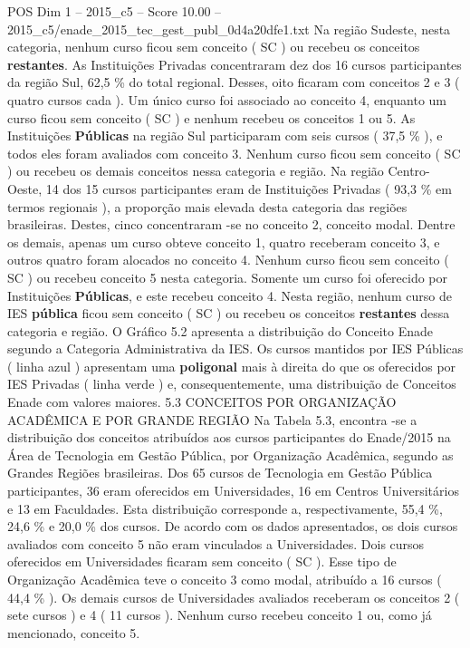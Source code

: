 \begin{textsample}{POS Dim 1 – 2015\_c5 – Score 10.00 – 2015\_c5/enade\_2015\_tec\_gest\_publ\_0d4a20dfe1.txt}
Na região Sudeste, nesta categoria, nenhum curso ficou sem conceito ( SC ) ou recebeu os conceitos \textbf{restantes}.
As Instituições Privadas concentraram dez dos 16 cursos participantes da região Sul, 62,5 \% do total regional.
Desses, oito ficaram com conceitos 2 e 3 ( quatro cursos cada ).
Um único curso foi associado ao conceito 4, enquanto um curso ficou sem conceito ( SC ) e nenhum recebeu os conceitos 1 ou 5.
As Instituições \textbf{Públicas} na região Sul participaram com seis cursos ( 37,5 \% ), e todos eles foram avaliados com conceito 3.
Nenhum curso ficou sem conceito ( SC ) ou recebeu os demais conceitos nessa categoria e região.
Na região Centro-Oeste, 14 dos 15 cursos participantes eram de Instituições Privadas ( 93,3 \% em termos regionais ), a proporção mais elevada desta categoria das regiões brasileiras.
Destes, cinco concentraram -se no conceito 2, conceito modal.
Dentre os demais, apenas um curso obteve conceito 1, quatro receberam conceito 3, e outros quatro foram alocados no conceito 4.
Nenhum curso ficou sem conceito ( SC ) ou recebeu conceito 5 nesta categoria.
Somente um curso foi oferecido por Instituições \textbf{Públicas}, e este recebeu conceito 4.
Nesta região, nenhum curso de IES \textbf{pública} ficou sem conceito ( SC ) ou recebeu os conceitos \textbf{restantes} dessa categoria e região.
O Gráfico 5.2 apresenta a distribuição do Conceito Enade segundo a Categoria Administrativa da IES.
Os cursos mantidos por IES Públicas ( linha azul ) apresentam uma \textbf{poligonal} mais à direita do que os oferecidos por IES Privadas ( linha verde ) e, consequentemente, uma distribuição de Conceitos Enade com valores maiores. 5.3 CONCEITOS POR ORGANIZAÇÃO ACADÊMICA E POR GRANDE REGIÃO Na Tabela 5.3, encontra -se a distribuição dos conceitos atribuídos aos cursos participantes do Enade/2015 na Área de Tecnologia em Gestão Pública, por Organização Acadêmica, segundo as Grandes Regiões brasileiras.
Dos 65 cursos de Tecnologia em Gestão Pública participantes, 36 eram oferecidos em Universidades, 16 em Centros Universitários e 13 em Faculdades.
Esta distribuição corresponde a, respectivamente, 55,4 \%, 24,6 \% e 20,0 \% dos cursos.
De acordo com os dados apresentados, os dois cursos avaliados com conceito 5 não eram vinculados a Universidades.
Dois cursos oferecidos em Universidades ficaram sem conceito ( SC ).
Esse tipo de Organização Acadêmica teve o conceito 3 como modal, atribuído a 16 cursos ( 44,4 \% ).
Os demais cursos de Universidades avaliados receberam os conceitos 2 ( sete cursos ) e 4 ( 11 cursos ).
Nenhum curso recebeu conceito 1 ou, como já mencionado, conceito 5.

\end{textsample}

